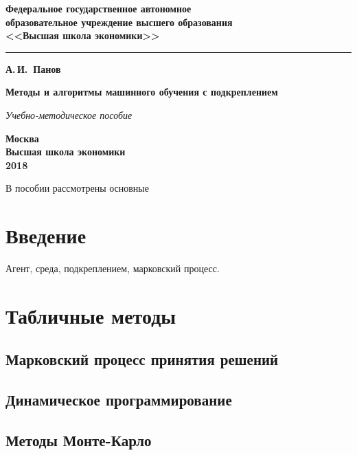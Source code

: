 \documentclass[11pt]{memoir}
\begin{document}
	\pagestyle{empty}
		\begin{center}
			{\bfseries  Федеральное государственное автономное \\
				образовательное учреждение высшего образования\\
				<<Высшая школа экономики>>
				
			}

			\vspace{-5pt}
			\noindent\rule{\textwidth}{2pt}
			
			\vspace{50pt}
			{\Large\bfseries А.\,И.~Панов}
			
			\vspace{100pt}
			{\Huge\bfseries Методы и алгоритмы машинного обучения с подкреплением}
			
			\vspace{20pt}
			{\Large\itshape Учебно-методическое пособие}
			
			\vfill
			{\bfseries Москва\\
				Высшая школа экономики\\
				2018
			}
		\end{center}

	
	\frontmatter
	
	В пособии рассмотрены основные 
	
	\clearpage
	\tableofcontents %
		
	\mainmatter
	
	\chapter*{Введение}
	Агент, среда, подкреплением, марковский процесс.

	\chapter{Табличные методы}
		\section{Марковский процесс принятия решений}
		
		\section{Динамическое программирование}
	
		\section{Методы Монте-Карло}
		
\end{document}
